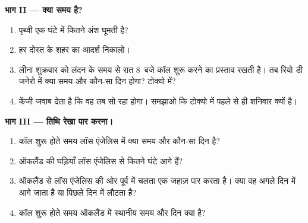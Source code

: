 \begin{problem}
\medskip
\noindent\textbf{भाग II --- क्या समय है?}
\begin{enumerate}[resume]
  \item पृथ्वी एक घंटे में कितने अंश घूमती है?
  \item हर दोस्त के शहर का आदर्श  निकालो।
  \item लीना शुक्रवार को लंदन के समय से रात 8~बजे कॉल शुरू करने का प्रस्ताव रखती है।
        तब रियो डी जनेरो में क्या समय और कौन-सा दिन होगा? टोक्यो में?
  \item केंजी जवाब देता है कि वह तब सो रहा होगा। समझाओ कि टोक्यो में पहले से ही
        शनिवार क्यों है।
\end{enumerate}

\medskip
\noindent\textbf{भाग III --- तिथि रेखा पार करना।}
\begin{enumerate}[resume]
  \item कॉल शुरू होते समय लॉस एंजेलिस में क्या समय और कौन-सा दिन है?
  \item ऑकलैंड की घड़ियाँ लॉस एंजेलिस से कितने घंटे आगे हैं?
  \item ऑकलैंड से लॉस एंजेलिस की ओर पूर्व में चलता एक जहाज़  पार करता है।
        क्या वह अगले दिन में आगे जाता है या पिछले दिन में लौटता है?
  \item कॉल शुरू होते समय ऑकलैंड में स्थानीय समय और दिन क्या है?
\end{enumerate}
\end{problem}
